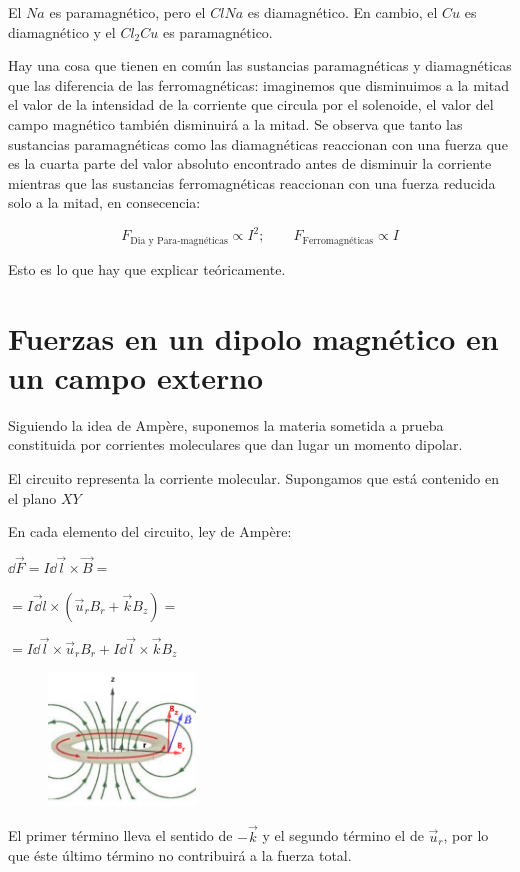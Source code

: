 El $Na$ es paramagnético, pero el $ClNa$ es diamagnético. En cambio, el $Cu$ es diamagnético y el $Cl_2Cu$ es paramagnético.

Hay una cosa que tienen en común las sustancias paramagnéticas y diamagnéticas que las diferencia de las ferromagnéticas: imaginemos que disminuimos a la mitad el valor de la intensidad de la corriente que circula por el solenoide, el valor del campo magnético también disminuirá a la mitad. Se observa que tanto las sustancias paramagnéticas como las diamagnéticas reaccionan con una fuerza que es la cuarta parte del valor absoluto encontrado antes de disminuir la corriente mientras que las sustancias ferromagnéticas reaccionan con una fuerza reducida solo a la mitad, en consecencia:

$$F_{\text{Dia y Para-magnéticas}} \propto I^2; \qquad F_{\text{Ferromagnéticas}} \propto I$$

Esto es lo que hay que explicar teóricamente.

\section[Fuerzas en un dipolo magnético en un campo externo]{Fuerzas en un dipolo magnético en un campo externo}


Siguiendo la idea de Ampère, suponemos la materia sometida a prueba constituida por corrientes moleculares que dan lugar un momento dipolar.


\begin{multicols}{2}
El circuito representa la corriente molecular. Supongamos que está contenido en el plano $XY$

En cada elemento del circuito, ley de Ampère:

$\dd \vec F = I \dd \vec l \times \vec B=$

$=I\vec \dd l \times (\vec u_r B_r + \vec k B_z)=$

$=I\dd \vec l \times \vec u_r B_r + I\dd \vec l \times \vec k B_z$
\begin{figure}[H]
	\centering
	\includegraphics[width=0.35\textwidth]{imagenes/imagenes28/T28IM02.png}
\end{figure}	
\end{multicols}
El primer término lleva el sentido de $-\vec k$ y el segundo término el de $\vec u_r$, por lo que éste último término no contribuirá a la fuerza total.

